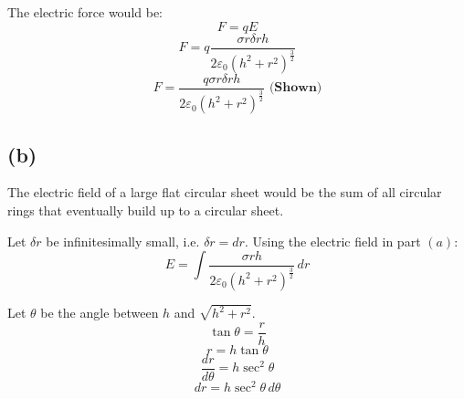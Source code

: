 \documentclass[11pt]{article}
\begin{document}
\newpage

The electric force would be:
\[F = qE\]
\[F = q \frac{\sigma r \delta r h}{2 \varepsilon_0 (h^2 + r^2)^{\frac{3}{2}}}\]
\[F = \frac{q \sigma r \delta r h}{2 \varepsilon_0 (h^2 + r^2)^{\frac{3}{2}}} \textbf{ (Shown)}\]
\subsection{(b)}
\label{sec:org9b6ae2f}
The electric field of a large flat circular sheet would be the sum of all circular rings that eventually build up to a circular sheet.


Let \(\delta r\) be infinitesimally small, i.e. \(\delta r = dr\). Using the electric field in part \((a)\):
\[E = \int \frac{\sigma r h}{2 \varepsilon_0 (h^2 + r^2)^{\frac{3}{2}}} \, dr\]

Let \(\theta\) be the angle between \(h\) and \(\sqrt{h^2 + r^2}\).
\[\tan \theta = \frac{r}{h}\]
\[r = h \tan \theta\]
\[\frac{dr}{d \theta} = h \sec^2 \theta\]
\[dr = h \sec^2 \theta \, d \theta\]
\end{document}
